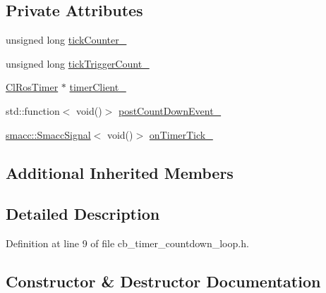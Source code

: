 \subsection*{Private Attributes}
\begin{DoxyCompactItemize}
\item 
unsigned long \hyperlink{classros__timer__client_1_1CbTimerCountdownLoop_a7f9185e95af1d5be03be20b466122239}{tick\+Counter\+\_\+}
\item 
unsigned long \hyperlink{classros__timer__client_1_1CbTimerCountdownLoop_a864df8e309c3cbbb1fd225faf6d2cadf}{tick\+Trigger\+Count\+\_\+}
\item 
\hyperlink{classros__timer__client_1_1ClRosTimer}{Cl\+Ros\+Timer} $\ast$ \hyperlink{classros__timer__client_1_1CbTimerCountdownLoop_a71e00f5443da2a1422a58c68a5e940a4}{timer\+Client\+\_\+}
\item 
std\+::function$<$ void()$>$ \hyperlink{classros__timer__client_1_1CbTimerCountdownLoop_a4ed7025f6f2d7222fe6471a901f134db}{post\+Count\+Down\+Event\+\_\+}
\item 
\hyperlink{classsmacc_1_1SmaccSignal}{smacc\+::\+Smacc\+Signal}$<$ void()$>$ \hyperlink{classros__timer__client_1_1CbTimerCountdownLoop_aebbc8d9b3b4f6a6b8b9dd8b46d9264d6}{on\+Timer\+Tick\+\_\+}
\end{DoxyCompactItemize}
\subsection*{Additional Inherited Members}


\subsection{Detailed Description}


Definition at line 9 of file cb\+\_\+timer\+\_\+countdown\+\_\+loop.\+h.



\subsection{Constructor \& Destructor Documentation}
